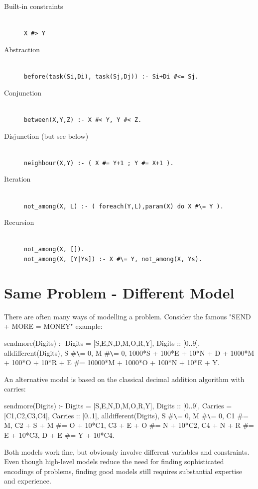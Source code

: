 \begin{description}
\item[Built-in constraints]\ \\
    \verb?X #> Y?
\item[Abstraction]\ \\
    \verb?before(task(Si,Di), task(Sj,Dj)) :- Si+Di #<= Sj.?
\item[Conjunction]\ \\
    \verb?between(X,Y,Z) :- X #< Y, Y #< Z.?
\item[Disjunction (but see below)]\ \\
    \verb?neighbour(X,Y) :- ( X #= Y+1 ; Y #= X+1 ).?
\item[Iteration]\ \\
    \verb?not_among(X, L) :- ( foreach(Y,L),param(X) do X #\= Y ).?
\item[Recursion]\ \\
    \verb?not_among(X, []).?\\
    \verb?not_among(X, [Y|Ys]) :- X #\= Y, not_among(X, Ys).?
\end{description}


\section{Same Problem - Different Model}

There are often many ways of modelling a problem.
Consider the famous "SEND + MORE = MONEY" example:
\begin{code}
sendmore(Digits) :-
    Digits = [S,E,N,D,M,O,R,Y],
    Digits :: [0..9],
    alldifferent(Digits),
    S #\verb.\.= 0, M #\verb.\.= 0,
                 1000*S + 100*E + 10*N + D
               + 1000*M + 100*O + 10*R + E
    #= 10000*M + 1000*O + 100*N + 10*E + Y.
\end{code}
An alternative model is based on the classical decimal addition algorithm with
carries:
\begin{code}
sendmore(Digits) :-
    Digits = [S,E,N,D,M,O,R,Y],
    Digits :: [0..9],
    Carries = [C1,C2,C3,C4],
    Carries :: [0..1],
    alldifferent(Digits),
    S #\verb.\.= 0,
    M #\verb.\.= 0,
    C1         #= M,
    C2 + S + M #= O + 10*C1,
    C3 + E + O #= N + 10*C2,
    C4 + N + R #= E + 10*C3,
         D + E #= Y + 10*C4.
\end{code}
Both models work fine, but obviously involve different variables and
constraints. Even though high-level models reduce the need for finding
sophisticated encodings of problems, finding good models still requires
substantial expertise and experience.

